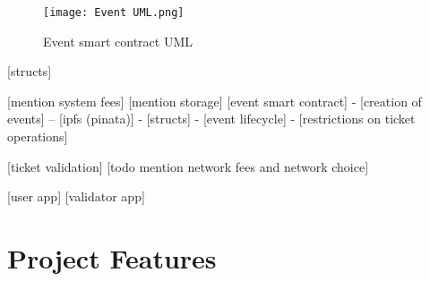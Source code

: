 \begin{figure}[H]
    \texttt{[image: Event UML.png]}
    \centering
    \caption{Event smart contract UML}
    \label{fig:event_uml}
\end{figure}

[structs]

[mention system fees]
[mention storage]
[event smart contract]
- [creation of events]
-- [ipfs (pinata)]
- [structs]
- [event lifecycle]
- [restrictions on ticket operations]

[ticket validation]
[todo mention network fees and network choice]

[user app]
[validator app]

\section{Project Features}
